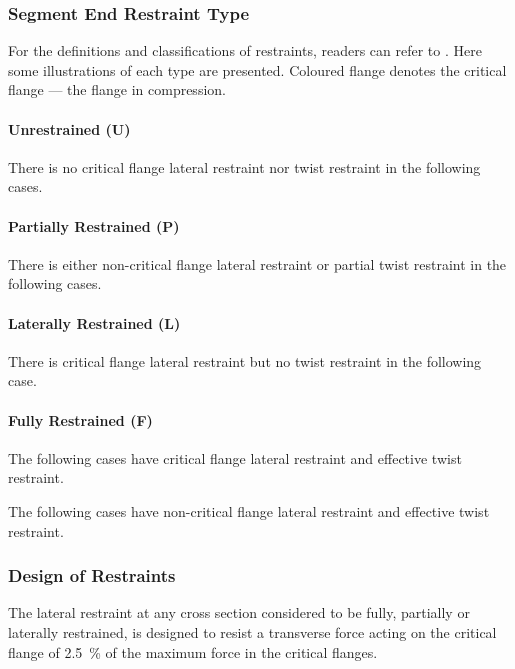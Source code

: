 \subsubsection{Segment End Restraint Type}
For the definitions and classifications of restraints, readers can refer to .
Here some illustrations of each type are presented.
\textcolor{cc0066}{Coloured} flange denotes the critical flange --- the flange in compression.
\paragraph{Unrestrained (U)}
There is no critical flange lateral restraint nor twist restraint in the following cases.
\begin{figure}[H]
\centering
\end{figure}
\paragraph{Partially Restrained (P)}
There is either non-critical flange lateral restraint or partial twist restraint in the following cases.
\begin{figure}[H]
\centering
\end{figure}
\paragraph{Laterally Restrained (L)}
There is critical flange lateral restraint but no twist restraint in the following case.
\begin{figure}[H]
\centering
\end{figure}
\paragraph{Fully Restrained (F)}
The following cases have critical flange lateral restraint and effective twist restraint.
\begin{figure}[H]
\centering
\end{figure}

The following cases have non-critical flange lateral restraint and effective twist restraint.
\begin{figure}[H]
\centering
\end{figure}
\subsubsection{Design of Restraints}
The lateral restraint at any cross section considered to be fully, partially or laterally restrained, is designed to resist a transverse force acting on the critical flange of \SI{2.5}{\percent} of the maximum force in the critical flanges.
\begin{figure}[H]
\centering
\end{figure}
